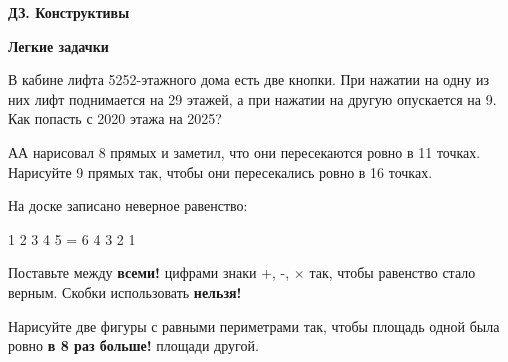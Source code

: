 \centerline{\bf \Huge ДЗ. Конструктивы}
\centerline{\bf \Huge }

\begin{flushright}
        \scriptsize{\textbf{Легкие задачки}}
\end{flushright}

 В кабине лифта 5252-этажного дома есть две кнопки. При нажатии на одну из них лифт поднимается на 29 этажей, а при нажатии на другую опускается на 9. Как попасть с 2020 этажа на 2025?

 АА нарисовал 8 прямых и заметил, что они пересекаются ровно в 11 точках. Нарисуйте 9 прямых так, чтобы они пересекались ровно в 16 точках.

 На доске записано неверное равенство:

1 2 3 4 5 = 6 4 3 2 1

Поставьте между \textbf{всеми!} цифрами знаки +, -, $\times$ так, чтобы равенство стало верным. Скобки использовать \textbf{нельзя!}


 Нарисуйте две фигуры с равными периметрами так, чтобы площадь одной была ровно \textbf{в 8 раз больше!} площади другой.